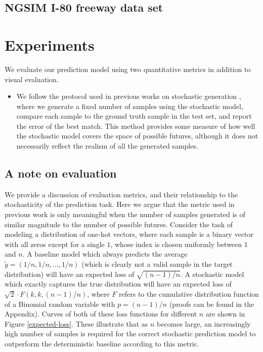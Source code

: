 \documentclass{article}
\begin{document}


\subsection{NGSIM I-80 freeway data set}




\section{Experiments}


We evaluate our prediction model using two quantitative metrics in addition to visual evaluation.
\begin{itemize}
\item We follow the protocol used in previous works on stochastic generation \citep{Walker2016, Babaeizadeh2018, Denton2018}, where we generate a fixed number of samples using the stochastic model, compare each sample to the ground truth sample in the test set, and report the error of the best match.
  This method provides some measure of how well the stochastic model covers the space of possible futures, although it does not necessarily reflect the realism of all the generated samples.
\end{itemize}


\subsection{A note on evaluation}

We provide a discussion of evaluation metrics, and their relationship to the stochasticity of the prediction task.
Here we argue that the metric used in previous work \citep{Walker2016, Babaeizadeh2018, Denton2018} is only meaningful when the number of samples generated is of similar magnitude to the number of possible futures.
Consider the task of modeling a distribution of one-hot vectors, where each sample is a binary vector with all zeros except for a single $1$, whose index is chosen uniformly between $1$ and $n$.
A baseline model which always predicts the average $\tilde{y} = (1/n, 1/n, ..., 1/n)$ (which is clearly not a valid sample in the target distribution) will have an expected loss of $\sqrt{(n-1)/n}$. A stochastic model which exactly captures the true distribution will have an expected loss of $\sqrt{2} \cdot F(k, k, (n-1)/n)$, where $F$ refers to the cumulative distribution function of a Binomial random variable with $p=(n-1)/n$ (proofs can be found in the Appendix).
Curves of both of these loss functions for different $n$ are shown in Figure \ref{expected-loss}.
These illustrate that as $n$ becomes large, an increasingly high number of samples is required for the correct stochastic prediction model to outperform the deterministic baseline according to this metric.
\end{document}
